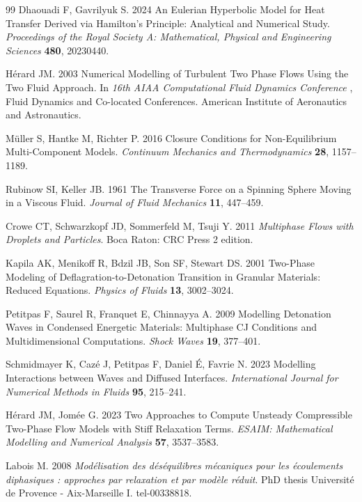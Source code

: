 \documentclass{myclass}
\begin{document}
\begin{thebibliography}{99}
Dhaouadi F, Gavrilyuk S. 2024  An {{Eulerian}} Hyperbolic Model for Heat
  Transfer Derived via {{Hamilton}}'s Principle: Analytical and Numerical
  Study. {\em Proceedings of the Royal Society A: Mathematical, Physical and
  Engineering Sciences} \textbf{480}, 20230440.

H{\'e}rard JM. 2003  Numerical {{Modelling}} of {{Turbulent Two Phase Flows
  Using}} the {{Two Fluid Approach}}. In {\em 16th {{AIAA Computational Fluid
  Dynamics Conference}}} ,  Fluid {{Dynamics}} and {{Co-located Conferences}}.
  {American Institute of Aeronautics and Astronautics}.

M{\"u}ller S, Hantke M, Richter P. 2016  Closure Conditions for Non-Equilibrium
  Multi-Component Models. {\em Continuum Mechanics and Thermodynamics}
  \textbf{28}, 1157--1189.

Rubinow SI, Keller JB. 1961  The Transverse Force on a Spinning Sphere Moving
  in a Viscous Fluid. {\em Journal of Fluid Mechanics} \textbf{11}, 447--459.

Crowe CT, Schwarzkopf JD, Sommerfeld M, Tsuji Y. 2011 {\em Multiphase {{Flows}}
  with {{Droplets}} and {{Particles}}}.
Boca Raton: CRC Press 2 edition.

Kapila AK, Menikoff R, Bdzil JB, Son SF, Stewart DS. 2001  Two-Phase Modeling
  of Deflagration-to-Detonation Transition in Granular Materials: {{Reduced}}
  Equations. {\em Physics of Fluids} \textbf{13}, 3002--3024.

Petitpas F, Saurel R, Franquet E, Chinnayya A. 2009  Modelling Detonation Waves
  in Condensed Energetic Materials: Multiphase {{CJ}} Conditions and
  Multidimensional Computations. {\em Shock Waves} \textbf{19}, 377--401.

Schmidmayer K, Caz{\'e} J, Petitpas F, Daniel {\'E}, Favrie N. 2023  Modelling
  Interactions between Waves and Diffused Interfaces. {\em International
  Journal for Numerical Methods in Fluids} \textbf{95}, 215--241.

H{\'e}rard JM, Jom{\'e}e G. 2023  Two Approaches to Compute Unsteady
  Compressible Two-Phase Flow Models with Stiff Relaxation Terms. {\em ESAIM:
  Mathematical Modelling and Numerical Analysis} \textbf{57}, 3537--3583.

Labois M. 2008 {\em {Mod{\'e}lisation des d{\'e}s{\'e}quilibres m{\'e}caniques
  pour les {\'e}coulements diphasiques : approches par relaxation et par
  mod{\`e}le r{\'e}duit}}.
PhD thesis Universit{\'e} de Provence - Aix-Marseille I.
tel-00338818.


\end{thebibliography}
\end{document}
